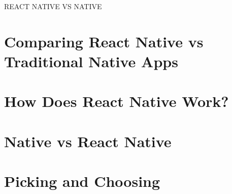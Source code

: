 \documentclass[a4paper]{article}
\begin{document}
  \begin{center}
    \huge{\uppercase{React Native vs Native}}
  \end{center}

  \tableofcontents
  \pagebreak


  \section{Comparing React Native vs Traditional Native Apps}
  


  \section{How Does React Native Work?}
  


  \section{Native vs React Native}
  


  \section{Picking and Choosing}
  



\end{document}
